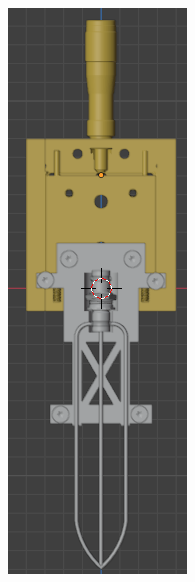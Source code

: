 \begin{figure}[!ht]
	\begin{minipage}[c]{0.5\textwidth}
			\begin{subfigure}{\textwidth}
					\centering
					\includegraphics[height=1.30253508\textwidth]{Figures/21_04_2025/Vista_frontal_conector_y_sensor}
					\captionsetup{width=0.8\textwidth}
				\end{subfigure}
		\end{minipage}\begin{minipage}[c]{0.49\textwidth}
			\begin{subfigure}{\textwidth}
					\centering

\end{subfigure}
\end{minipage}
\end{figure}
